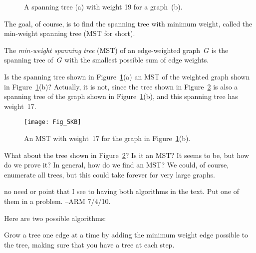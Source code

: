 \begin{figure}\redrawn

%
\qquad
%

\caption{A spanning tree (a) with weight 19 for a graph~(b).}

\label{fig:5KA}

\end{figure}

The goal, of course, is to find the spanning tree with minimum weight,
called the min-weight spanning tree (MST for short).

\begin{definition}
The \emph{min-weight spanning tree} \textup(MST\textup) of an
edge-weighted graph~$G$ is the spanning tree of~$G$ with the smallest
possible sum of edge weights.
\end{definition}

Is the spanning tree shown in Figure~\ref{fig:5KA}(a) an MST of the
weighted graph shown in Figure~\ref{fig:5KA}(b)?  Actually, it is not,
since the tree shown in Figure~\ref{fig:5KB} is also a spanning tree
of the graph shown in Figure~\ref{fig:5KA}(b), and this spanning tree
has weight~17.

\begin{figure}\redrawn

\texttt{[image: Fig\_5KB]}

\caption{An MST with weight~17 for the graph in
  Figure~\ref{fig:5KA}(b).}
\label{fig:5KB}

\end{figure}

What about the tree shown in Figure~\ref{fig:5KB}?  Is it an MST?  It
seems to be, but how do we prove it?  In general, how do we find an
MST\@?  We could, of course, enumerate all trees, but this could take
forever for very large graphs.

\begin{staffnotes}no need or point that I see to having both
  algorithms in the text.  Put one of them in a problem. --ARM 7/4/10.
\end{staffnotes}
Here are two possible algorithms:

\begin{algorithm}\label{alg:MST1}
  Grow a tree one edge at a time by adding the minimum weight edge
  possible to the tree, making sure that you have a tree at each
  step.
\end{algorithm}

